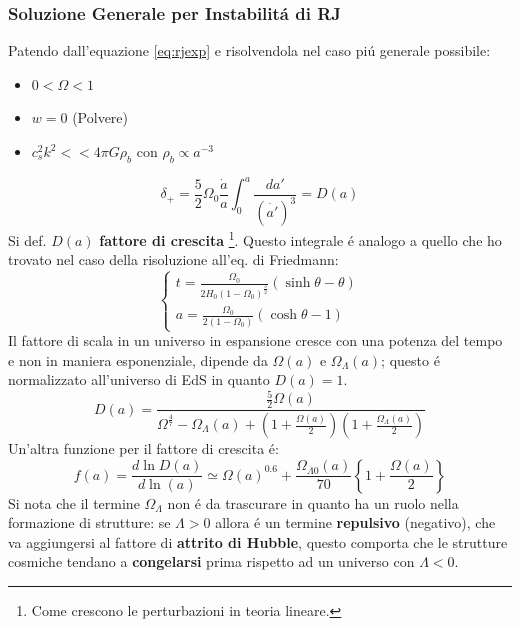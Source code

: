 \documentclass[12pt, a4paper]{article}
\begin{document}
\subsubsection{Soluzione Generale per Instabilit\'{a} di RJ}
Patendo dall'equazione \ref{eq:rjexp} e risolvendola nel caso pi\'{u} generale possibile:
\begin{itemize}
\item $0<\Omega<1$
\item $w=0$ (Polvere)
\item $c_s^2k^2<<4\pi G\rho_b$ con $\rho_{b}\propto a^{-3}$
\end{itemize}
\begin{equation}
\delta_+=\frac{5}{2} \Omega_0 \frac{\dot{a}}{a}\int_0^a \frac{da'}{(\dot{a'})^3}=D(a)
\end{equation}
Si def. $D(a)$ \textbf{fattore di crescita} \footnote{Come crescono le perturbazioni in teoria lineare.}. Questo integrale \'{e} analogo a quello che ho trovato nel caso della risoluzione all'eq. di Friedmann:
\begin{equation}
\begin{cases}
t=\frac{\Omega_0}{2H_0(1-\Omega_0)^{\frac{3}{2}}}(\sinh{\theta}-\theta)
\\
a=\frac{\Omega_0}{2(1-\Omega_0)}(\cosh{\theta}-1)
\end{cases}
\end{equation}
Il fattore di scala in un universo in espansione cresce con una potenza del tempo e non in maniera esponenziale, dipende da $\Omega(a)$ e $\Omega_{\Lambda }(a)$;  questo \'{e} normalizzato all'universo di EdS in quanto  $D(a)=1$.
\begin{equation}
D(a)=\frac{\frac{5}{2}\Omega(a)}{\Omega^{\frac{4}{7}}- \Omega_{\Lambda}(a)+(1+\frac{\Omega(a)}{2})(1+\frac{\Omega_{\Lambda}(a)}{2})}
\end{equation}
Un'altra funzione per il fattore di crescita \'{e}:
\begin{equation}
f(a)=\frac{d\ln{D(a)}}{d\ln(a)}\simeq \Omega(a)^{0.6}+\frac{\Omega_{\Lambda 0}(a)}{70}\left\{1+\frac{\Omega(a)}{2}\right\}
\end{equation}
Si nota che il termine $\Omega_{\Lambda}$ non \'{e} da trascurare in quanto ha un ruolo nella formazione di strutture: se $\Lambda>0$ allora  \'{e} un termine \textbf{repulsivo} (negativo), che va aggiungersi al fattore di \textbf{attrito di Hubble}, questo comporta che le strutture cosmiche tendano a \textbf{congelarsi} prima rispetto ad un universo con $\Lambda<0$.
\end{document}
